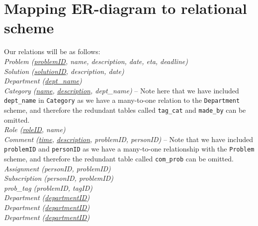 \section{Mapping ER-diagram to relational scheme}
\label{sec:map_er_rel}

Our relations will be as follows:\\

\noindent \textit{Problem (\underline{problemID}, name, description, date, eta, deadline)} \\
\textit{Solution (\underline{solutionID}, description, date)} \\
\textit{Department (\underline{dept\_name})} \\
\textit{Category (\underline{name}, \underline{description}, dept\_name)} -- Note here that we have included \verb+dept_name+ in \verb+Category+ as we have a many-to-one relation to the \verb+Department+ scheme, and therefore the redundant tables called \verb+tag_cat+ and \verb+made_by+ can be omitted.\\
\textit{Role (\underline{roleID}, name)} \\
\textit{Comment (\underline{time}, \underline{description}, problemID, personID)} -- Note that we have included \verb+problemID+ and \verb+personID+ as we have a many-to-one relationship with the \verb+Problem+ scheme, and therefore the redundant table called \verb+com_prob+ can be omitted.\\
\textit{Assignment (personID, problemID)} \\
\textit{Subscription (personID, problemID)} \\
\textit{prob\_tag (problemID, tagID)} \\
\textit{Department (\underline{departmentID})} \\
\textit{Department (\underline{departmentID})} \\
\textit{Department (\underline{departmentID})} \\